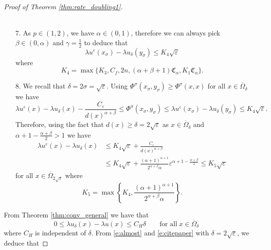 \documentclass[11pt,reqno]{amsart}
\numberwithin{figure}{section}
\theoremstyle{plain}
\theoremstyle{remark}
\numberwithin{equation}{section}
\begin{document}
\begin{proof}[Proof of Theorem \ref{thm:rate_doubling1}]
\begin{enumerate}
\begin{align*}
\end{align*}
\item[7.] As $p\in (1,2)$, we have $\alpha\in (0,1)$, therefore we can always pick $\beta \in (0,\alpha)$ and $\gamma = \frac{1}{2}$ to deduce that 
\begin{equation*}
     \lambda u^\varepsilon(x_\sigma) - \lambda u_\delta(y_\sigma) \leq K_4 \sqrt{\varepsilon}
\end{equation*}
where 
\begin{equation*}
    K_4 = \max\big\lbrace K_3,C_f,2n, (\alpha+\beta+1)\mathfrak{C}_\alpha, K_1\mathfrak{C}_\alpha \big\rbrace.   
\end{equation*}
\item[8.] We recall that $\delta = 2\sigma = \sqrt{\varepsilon}$. Using $\Phi^\sigma(x_\sigma,y_\sigma)\geq \Phi^\sigma(x,x)$ for all $x\in \overline{\Omega}_\delta$ we have
\begin{equation*}
    \lambda u^\varepsilon(x) - \lambda u_\delta(x) - \frac{C_\varepsilon}{d(x)^{\alpha+\beta}} \leq \Phi^\sigma(x_\sigma,y_\sigma) \leq \lambda u^\varepsilon(x_\sigma) - \lambda u_\delta(y_\sigma) \leq K_4\sqrt{\varepsilon}.
\end{equation*}
Therefore, using the fact that $d(x)\geq \delta = 2\sqrt{\varepsilon}$ as $x\in \overline{\Omega}_\delta$ and $\alpha+1 - \frac{\alpha+\beta}{2} > 1$ we have
\begin{align}
    \lambda u^\varepsilon(x) - \lambda u_\delta(x) &\leq K_4\sqrt{\varepsilon} + \frac{C_\varepsilon}{d(x)^{\alpha+\beta}}\nonumber \\
    &\leq K_4\sqrt{\varepsilon} + \frac{(\alpha+1)^{\alpha+1}}{2^{\alpha+\beta}\alpha}\varepsilon^{\alpha+1 - \frac{\alpha+\beta}{2}}\leq K_5 \sqrt{\varepsilon}\label{e:almost}
\end{align}
for all $x\in \overline{\Omega}_{2\sqrt{\varepsilon}}$ where
\begin{equation*}
    K_5 = \max\left\lbrace K_4, \frac{(\alpha+1)^{\alpha+1}}{2^{\alpha+\beta}\alpha}\right\rbrace.
\end{equation*}
\end{enumerate}
From Theorem \ref{thm:conv_general} we have that
\begin{equation}\label{e:citepaper}
    0\leq \lambda u_\delta(x) - \lambda u(x)\leq C_H\delta \qquad\text{for all}\; x\in \overline{\Omega}_\delta
\end{equation}
where $C_H$ is independent of $\delta$. From \eqref{e:almost} and \eqref{e:citepaper} with $\delta = 2\sqrt{\varepsilon}$, we deduce that

\end{proof}
\end{document}
